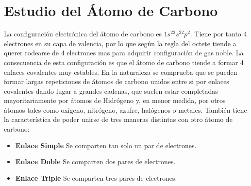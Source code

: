 \section{Estudio del Átomo de Carbono} 
La configuración electrónica del átomo de carbono es $1s^22s^22p^2$. Tiene por tanto 4 electrones en su capa de valencia, por lo que según la regla del octete tiende a querer rodearse de 4 electrones mas para adquirir configuración de gas noble. La consecuencia de esta configuración es que el átomo de carbono tiende a formar 4 enlaces covalentes muy estables. En la naturaleza se comprueba que se pueden formar largas repeticiones de átomos de carbono unidos entre si por enlaces covalentes dando lugar a grandes cadenas, que suelen estar completadas mayoritariamente por átomos de Hidrógeno y, en menor medida, por otros átomos tales como oxígeno, nitrógeno, azufre, halógenos o metales. También tiene la característica de poder unirse de tres maneras distintas con otro átomo de carbono:\\

\begin{itemize}
	\item\textbf{Enlace Simple} Se comparten tan solo un par de electrones.
	\item\textbf{Enlace Doble} Se comparten dos pares de electrones.
	\item\textbf{Enlace Triple} Se comparten tres pares de electrones.
\end{itemize}
